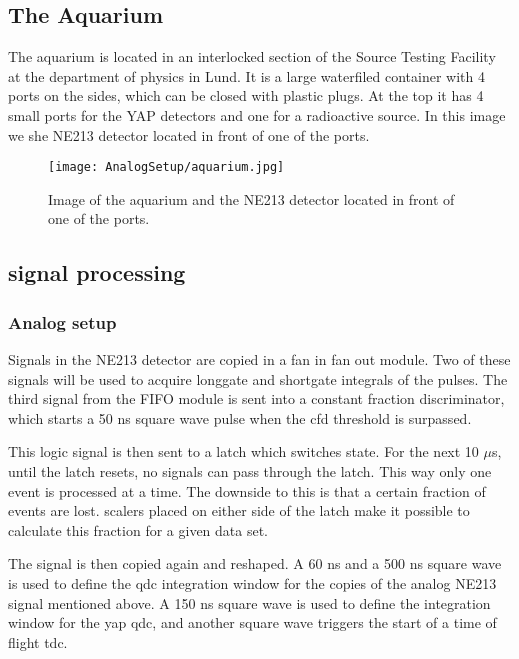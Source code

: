 \documentclass[main.tex]{subfiles}
\begin{document}


\subsection{The Aquarium}
The aquarium is located in an interlocked section of the Source Testing Facility at the department of physics in Lund. It is a large waterfiled container with 4 ports on the sides, which can be closed with plastic plugs. 
At the top it has 4 small ports for the YAP detectors and one for a radioactive source. In this image we she NE213 detector located in front of one of the ports.


\begin{figure}[ht]
	\centering
    	\texttt{[image: AnalogSetup/aquarium.jpg]}
        \caption{Image of the aquarium and the NE213 detector located in front of one of the ports.}
	    \label{fig:aquarium} 
\end{figure}
\newpage

\subsection{signal processing}
\subsubsection{Analog setup}
Signals in the NE213 detector are copied in a fan in fan out module. Two of these signals will be used to acquire longgate and shortgate integrals of the pulses. The third signal from the FIFO module is sent into a constant fraction discriminator, which starts a 50 ns square wave pulse when the cfd threshold is surpassed. 

This logic signal is then sent to a latch which switches state. For the next 10 $\mu$s, until the latch resets, no signals can pass through the latch. This way only one event is processed at a time. The downside to this is that a certain fraction of events are lost. scalers placed on either side of the latch make it possible to calculate this fraction for a given data set.

The signal is then copied again and reshaped. A 60 ns and a 500 ns square wave is used to define the qdc integration window for the copies of the analog NE213 signal mentioned above. A 150 ns square wave is used to define the integration window for the yap qdc, and another square wave triggers the start of a time of flight tdc.
\end{document}
